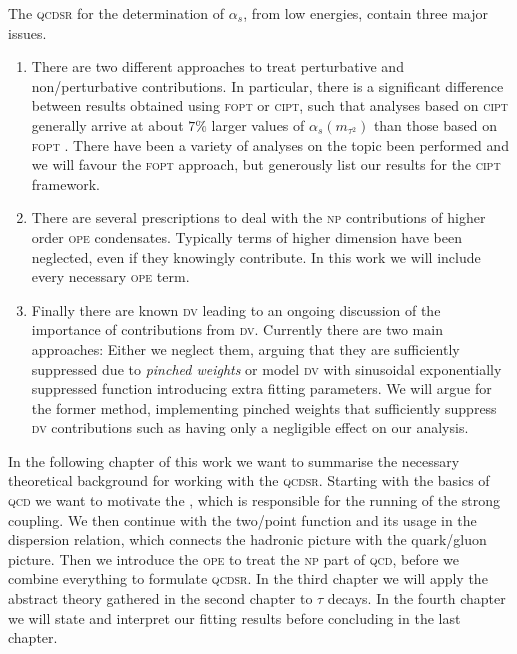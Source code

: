 \documentclass[../../index.tex]{subfiles}
\begin{document}
The \textsc{qcdsr} for the determination of \(\alpha_s\), from low energies,
contain three major issues.
\begin{enumerate}
\item There are two different approaches to treat perturbative and
  non\-/perturbative contributions. In particular, there is a significant
  difference between results obtained using \textsc{fopt} or \textsc{cipt},
  such that analyses based on \textsc{cipt} generally arrive at about \(7\%\)
  larger values of \(\alpha_s(m_{\tau^2})\) than those based on \textsc{fopt}
  \cite{PDG2018}. There have been a variety of analyses on the topic been
  performed \cite{Pich2013,Caprini2009,Jamin2005} and we will favour the
  \textsc{fopt} approach, but generously list our results for the \textsc{cipt}
  framework.

\item There are several prescriptions to deal with the \textsc{np} contributions
  of higher order \textsc{ope} condensates. Typically terms of higher dimension
  have been neglected, even if they knowingly contribute. In this work we will
  include every necessary \textsc{ope} term.

\item Finally there are known \textsc{dv} leading to an ongoing discussion of
  the importance of contributions from \textsc{dv}. Currently there are two main
  approaches: Either we neglect them, arguing that they are sufficiently
  suppressed due to \textit{pinched weights} \cite{Pich2016} or model
  \textsc{dv} with sinusoidal exponentially suppressed function
  \cite{Cata2008,Boito2011a,Boito2014} introducing extra fitting parameters. We
  will argue for the former method, implementing pinched weights that
  sufficiently suppress \textsc{dv} contributions such as having only a
  negligible effect on our analysis.
\end{enumerate}

In the following chapter of this work we want to summarise the necessary theoretical
background for working with the \textsc{qcdsr}. Starting with the basics of
\textsc{qcd} we want to motivate the , which is responsible for the running of the strong coupling. We
then continue with the two\-/point function and its usage in the dispersion
relation, which connects the hadronic picture with the quark\-/gluon picture.
Then we introduce the \textsc{ope} to treat the \textsc{np} part of
\textsc{qcd}, before we combine everything to formulate \textsc{qcdsr}. In the
third chapter we will apply the abstract theory gathered in the second chapter
to \(\tau\) decays. In the fourth chapter we will state and interpret our fitting
results before concluding in the last chapter.
\end{document}
